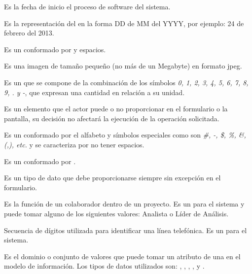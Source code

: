 \begin{description}
	 Es la fecha de inicio el proceso de software del sistema.

	 Es la representación del   en la forma DD de MM del YYYY, por ejemplo: 24 de febrero del 2013.

	 Es un  conformado por  y espacios.
	
	 Es una imagen de tamaño pequeño (no más de un Megabyte) en formato jpeg.
	
	 Es un  que se compone de la combinación de los símbolos \textit{0, 1, 2, 3, 4, 5, 6, 7, 8, 9, . y -},  que expresan una cantidad 
	en relación a su unidad.
	
	 Es un elemento que el actor puede o no proporcionar en el formulario o la pantalla, su decisión no afectará la ejecución de la operación solicitada.

	 Es un   conformado por el alfabeto y símbolos especiales como son 
	\textit{\#, -, \$, \%, \&, (,), etc.} y se caracteriza por no tener espacios.
	
	 Es un   conformado por .

	 Es un tipo de dato que debe proporcionarse siempre sin excepción en el formulario.
	
	 Es la función de un colaborador dentro de un proyecto. Es un  para el sistema y puede tomar alguno de los siguientes valores:
	Analista o Líder de Análisis.
	
	 Secuencia de dígitos utilizada para identificar una línea telefónica. Es un  para el sistema.
	
	 Es el dominio o conjunto de valores que puede tomar un atributo de una  en el modelo de información. Los tipos de datos 
	utilizados son: , , , ,  y 
	.
	
\end{description}
